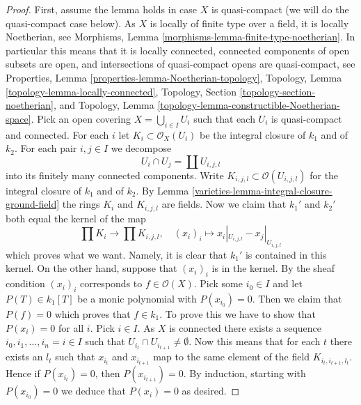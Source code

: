 \begin{proof}

First, assume the lemma holds in case $X$ is quasi-compact (we will
do the quasi-compact case below).
As $X$ is locally of finite type over a field, it is locally Noetherian, see
Morphisms, Lemma \ref{morphisms-lemma-finite-type-noetherian}.
In particular this means that it is locally connected,
connected components of open subsets are open, and
intersections of quasi-compact opens are quasi-compact, see
Properties, Lemma \ref{properties-lemma-Noetherian-topology},
Topology, Lemma \ref{topology-lemma-locally-connected},
Topology, Section \ref{topology-section-noetherian}, and
Topology, Lemma \ref{topology-lemma-constructible-Noetherian-space}.
Pick an open covering $X = \bigcup_{i \in I} U_i$
such that each $U_i$ is quasi-compact and connected.
For each $i$ let $K_i \subset \mathcal{O}_X(U_i)$ be the integral
closure of $k_1$ and of $k_2$.
For each pair $i, j \in I$ we decompose
$$
U_i \cap U_j = \coprod U_{i, j, l}
$$
into its finitely many connected components. Write
$K_{i, j, l} \subset \mathcal{O}(U_{i, j, l})$
for the integral closure of $k_1$ and of $k_2$. By
Lemma \ref{varieties-lemma-integral-closure-ground-field}
the rings $K_i$ and $K_{i, j, l}$ are fields.
Now we claim that $k_1'$ and $k_2'$ both equal the kernel of the map
$$
\prod K_i \longrightarrow \prod K_{i, j, l}, \quad
(x_i)_i \longmapsto x_i|_{U_{i, j, l}} - x_j|_{U_{i, j, l}}
$$
which proves what we want.
Namely, it is clear that $k_1'$ is contained in this kernel.
On the other hand, suppose that $(x_i)_i$ is in the kernel.
By the sheaf condition $(x_i)_i$ corresponds to $f \in \mathcal{O}(X)$.
Pick some $i_0 \in I$ and let $P(T) \in k_1[T]$ be a monic polynomial
with $P(x_{i_0}) = 0$. Then we claim that $P(f) = 0$ which proves
that $f \in k_1$. To prove this we have to show that $P(x_i) = 0$
for all $i$. Pick $i \in I$. As $X$ is connected there exists a
sequence $i_0, i_1, \ldots, i_n = i \in I$ such that
$U_{i_t} \cap U_{i_{t + 1}} \not = \emptyset$. Now this means that
for each $t$ there exists an $l_t$ such that $x_{i_t}$ and
$x_{i_{t + 1}}$ map to the same element of the field $K_{i_t, i_{t + 1}, l_t}$.
Hence if $P(x_{i_t}) = 0$, then $P(x_{i_{t + 1}}) = 0$. By
induction, starting with $P(x_{i_0}) = 0$ we deduce that
$P(x_i) = 0$ as desired.


\end{proof}
